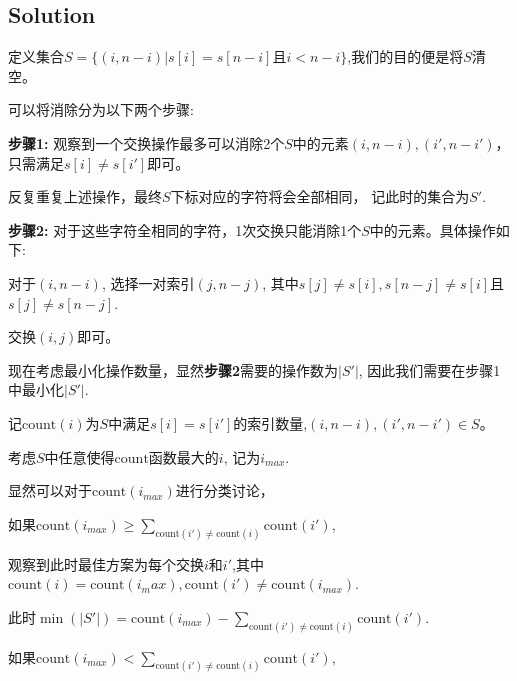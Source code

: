 \documentclass{article}
\newcommand{\Count}{\text{count}}
\begin{document}
    \subsection{Solution}
    定义集合$S = \{(i,n-i) | s[i] = s[n-i] \text{且} i<n-i\}$,我们的目的便是将$S$清空。

    可以将消除分为以下两个步骤:


    \textbf{步骤1:} 观察到一个交换操作最多可以消除2个$S$中的元素$(i,n-i),(i',n-i')$，只需满足$s[i] \neq s[i']$即可。

    反复重复上述操作，最终$S$下标对应的字符将会全部相同， 记此时的集合为$S'$.
    
    \textbf{步骤2:} 对于这些字符全相同的字符，1次交换只能消除1个$S$中的元素。具体操作如下:
    
    对于$(i,n-i)$, 选择一对索引$(j,n-j)$, 其中$s[j]\neq s[i] ,s[n-j] \neq s[i]$且 $s[j]\neq s[n-j]$.

    交换$(i,j)$即可。


    现在考虑最小化操作数量，显然\textbf{步骤2}需要的操作数为$|S'|$, 因此我们需要在步骤1中最小化$|S'|$.

    记$\Count(i)$为$S$中满足$s[i] = s[i']$的索引数量,$(i,n-i),(i',n-i')\in S$。
    
    考虑$S$中任意使得$\Count$函数最大的$i$, 记为$i_{max}$.

    显然可以对于$\Count(i_{max})$进行分类讨论，

    如果$\Count(i_{max}) \geq  \sum_{\Count(i') \neq \Count(i)} \Count(i')$, 
    
    观察到此时最佳方案为每个交换$i$和$i'$,其中$\Count(i) =  \Count(i_max), \Count(i')\neq \Count(i_{max})$.

    此时$\min(|S'|) = \Count(i_{max}) -  \sum_{\Count(i') \neq \Count(i)} \Count(i')$.
    

    如果$\Count(i_{max}) < \sum_{\Count(i') \neq \Count(i)} \Count(i')$,

    
\end{document}

